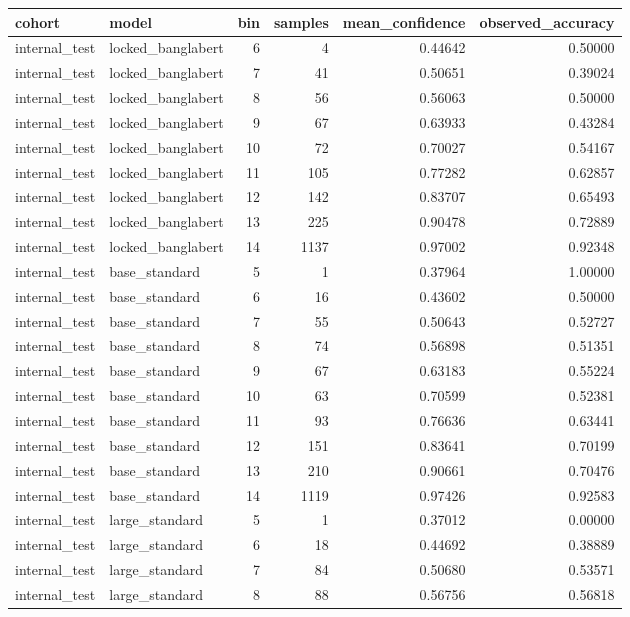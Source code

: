\begin{tabular}{llrrrr}
\toprule
cohort & model & bin & samples & mean\_confidence & observed\_accuracy \\
\midrule
internal\_test & locked\_banglabert & 6 & 4 & 0.44642 & 0.50000 \\
internal\_test & locked\_banglabert & 7 & 41 & 0.50651 & 0.39024 \\
internal\_test & locked\_banglabert & 8 & 56 & 0.56063 & 0.50000 \\
internal\_test & locked\_banglabert & 9 & 67 & 0.63933 & 0.43284 \\
internal\_test & locked\_banglabert & 10 & 72 & 0.70027 & 0.54167 \\
internal\_test & locked\_banglabert & 11 & 105 & 0.77282 & 0.62857 \\
internal\_test & locked\_banglabert & 12 & 142 & 0.83707 & 0.65493 \\
internal\_test & locked\_banglabert & 13 & 225 & 0.90478 & 0.72889 \\
internal\_test & locked\_banglabert & 14 & 1137 & 0.97002 & 0.92348 \\
internal\_test & base\_standard & 5 & 1 & 0.37964 & 1.00000 \\
internal\_test & base\_standard & 6 & 16 & 0.43602 & 0.50000 \\
internal\_test & base\_standard & 7 & 55 & 0.50643 & 0.52727 \\
internal\_test & base\_standard & 8 & 74 & 0.56898 & 0.51351 \\
internal\_test & base\_standard & 9 & 67 & 0.63183 & 0.55224 \\
internal\_test & base\_standard & 10 & 63 & 0.70599 & 0.52381 \\
internal\_test & base\_standard & 11 & 93 & 0.76636 & 0.63441 \\
internal\_test & base\_standard & 12 & 151 & 0.83641 & 0.70199 \\
internal\_test & base\_standard & 13 & 210 & 0.90661 & 0.70476 \\
internal\_test & base\_standard & 14 & 1119 & 0.97426 & 0.92583 \\
internal\_test & large\_standard & 5 & 1 & 0.37012 & 0.00000 \\
internal\_test & large\_standard & 6 & 18 & 0.44692 & 0.38889 \\
internal\_test & large\_standard & 7 & 84 & 0.50680 & 0.53571 \\
internal\_test & large\_standard & 8 & 88 & 0.56756 & 0.56818 \\

\end{tabular}
